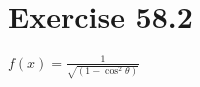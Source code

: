\documentclass[a4paper, 10pt]{scrartcl}
\begin{document}
\section{Exercise 58.2}

$f(x) = \frac{1}{\sqrt{(1 - \cos^{2}{\theta})}}$\\
\\
\end{document}
